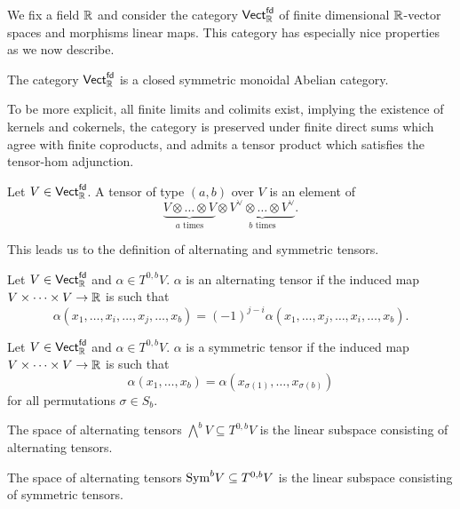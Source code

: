 We fix a field $\mathbb{R}$ and consider the category $\mathsf{Vect}^{\mathsf{fd}}_{\mathbb{R}}$ of finite dimensional $\mathbb{R}$-vector spaces and morphisms linear maps. This category has especially nice properties as we now describe. 
\begin{theorem}\label{thm: fdVect is Ab closed sym monoidal}
    The category $\mathsf{Vect}^{\mathsf{fd}}_{\mathbb{R}}$ is a closed symmetric monoidal Abelian category. 
\end{theorem}
To be more explicit, all finite limits and colimits exist, implying the existence of kernels and cokernels, the category is preserved under finite direct sums which agree with finite coproducts, and admits a tensor product which satisfies the tensor-hom adjunction. 
\begin{definition}[Tensor]\label{def: tensor}
    Let $V\in \mathsf{Vect}^{\mathsf{fd}}_{\mathbb{R}}$. A tensor of type $(a,b)$ over $V$ is an element of 
    $$\underbrace{V\otimes\dots\otimes V}_{a\text{ times}}\otimes\underbrace{V^{\vee}\otimes\dots\otimes V^{\vee}}_{b\text{ times}}.$$
\end{definition}
This leads us to the definition of alternating and symmetric tensors. 
\begin{definition}\label{def: alternating tensor}
    Let $V\in \mathsf{Vect}^{\mathsf{fd}}_{\mathbb{R}}$ and $\alpha\in T^{0,b}V$. $\alpha$ is an alternating tensor if the induced map $V\times\dots\times V\to\mathbb{R}$ is such that 
    $$\alpha(x_{1},\dots,x_{i},\dots,x_{j},\dots,x_{b})=(-1)^{j-i}\alpha(x_{1},\dots,x_{j},\dots,x_{i},\dots,x_{b}).$$
\end{definition}
\begin{definition}\label{def: symmetric tensor}
    Let $V\in \mathsf{Vect}^{\mathsf{fd}}_{\mathbb{R}}$ and $\alpha\in T^{0,b}V$. $\alpha$ is a symmetric tensor if the induced map $V\times\dots\times V\to\mathbb{R}$ is such that 
    $$\alpha(x_{1},\dots,x_{b})=\alpha(x_{\sigma(1)},\dots,x_{\sigma(b)})$$
    for all permutations $\sigma\in S_{b}$.
\end{definition}
\begin{definition}\label{def: space of alternating tensors}
    The space of alternating tensors $\bigwedge^{b}V\subseteq T^{0,b}V$ is the linear subspace consisting of alternating tensors. 
\end{definition}
\begin{definition}\label{def: space of symmetric tensors}
    The space of alternating tensors $\mathrm{Sym}^{b}V\subseteq T^{0,b}V$ is the linear subspace consisting of symmetric tensors.
\end{definition}